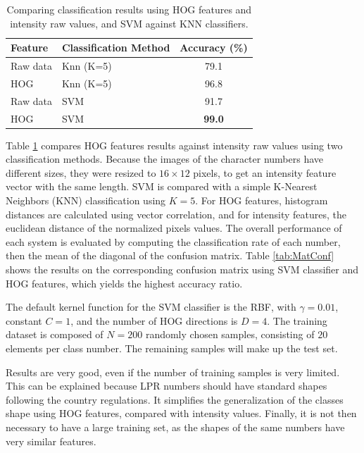\documentclass{ipol}
\begin{document}
\begin{table}[!h]
  \begin{center}
	\begin{tabular}{| l| l | c|}
    	\hline
			Feature & Classification Method & Accuracy (\%) \\
    	\hline
 Raw data & Knn (K=5)  &         79.1 \\
HOG & Knn (K=5)   &         96.8 \\
Raw data & SVM  &         91.7 \\
HOG & SVM  & \textbf{99.0} \\
    	\hline
	\end{tabular}
  \end{center}
  \caption{Comparing classification results using HOG features and intensity raw values, and SVM against KNN classifiers.}
  \label{tab:CompRes}
\end{table}


Table \ref{tab:CompRes} compares HOG features results against intensity raw values using two classification methods.
Because the images of the character numbers have different sizes, they were resized to $16 \times 12$ pixels, to get an intensity feature vector with the same length.
SVM is compared with a simple K-Nearest Neighbors (KNN) classification using $K=5$.
For HOG features, histogram distances are calculated using vector correlation, and for intensity features, the euclidean distance of the normalized pixels values.
The overall performance of each system is evaluated by computing the classification rate of each number, then the mean of the diagonal of the confusion matrix.
Table \ref{tab:MatConf} shows the results on the corresponding confusion matrix using SVM classifier and HOG features, which yields the highest accuracy ratio.

The default kernel function for the SVM classifier is the RBF, with $\gamma = 0.01$, constant $C=1$, and the number of HOG directions is $D=4$.
The training dataset is composed of $N=200$ randomly chosen samples, consisting of $20$ elements per class number.
The remaining samples will make up the test set.


Results are very good, even if the number of training samples is very limited.
This can be explained because LPR numbers should have standard shapes following the country regulations.
It simplifies the generalization of the classes shape using HOG features, compared with intensity values.
Finally, it is not then necessary to have a large training set, as the shapes of the same numbers have very similar features.
\end{document}
